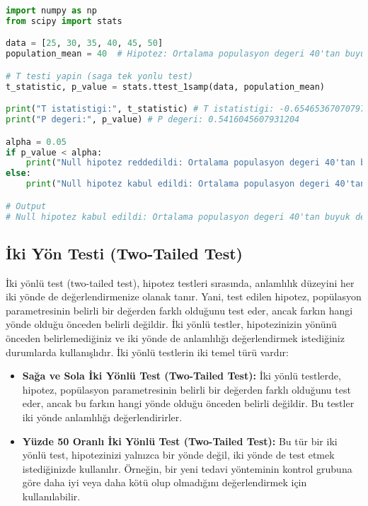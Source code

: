 \begin{lstlisting}[language=Python]
import numpy as np
from scipy import stats

data = [25, 30, 35, 40, 45, 50]
population_mean = 40  # Hipotez: Ortalama populasyon degeri 40'tan buyuktur.

# T testi yapin (saga tek yonlu test)
t_statistic, p_value = stats.ttest_1samp(data, population_mean)

print("T istatistigi:", t_statistic) # T istatistigi: -0.6546536707079772
print("P degeri:", p_value) # P degeri: 0.5416045607931204

alpha = 0.05
if p_value < alpha:
    print("Null hipotez reddedildi: Ortalama populasyon degeri 40'tan buyuktur.")
else:
    print("Null hipotez kabul edildi: Ortalama populasyon degeri 40'tan buyuk degildir.")

# Output
# Null hipotez kabul edildi: Ortalama populasyon degeri 40'tan buyuk degildir.
\end{lstlisting}

\newpage

\subsection{İki Yön Testi (Two-Tailed Test)}
İki yönlü test (two-tailed test), hipotez testleri sırasında, anlamlılık düzeyini her iki yönde de değerlendirmenize olanak tanır. Yani, test edilen hipotez, popülasyon parametresinin belirli bir değerden farklı olduğunu test eder, ancak farkın hangi yönde olduğu önceden belirli değildir. İki yönlü testler, hipotezinizin yönünü önceden belirlemediğiniz ve iki yönde de anlamlılığı değerlendirmek istediğiniz durumlarda kullanışlıdır. İki yönlü testlerin iki temel türü vardır:

\begin{itemize}
    \item \textbf{Sağa ve Sola İki Yönlü Test (Two-Tailed Test):} İki yönlü testlerde, hipotez, popülasyon parametresinin belirli bir değerden farklı olduğunu test eder, ancak bu farkın hangi yönde olduğu önceden belirli değildir. Bu testler iki yönde anlamlılığı değerlendirirler.
    \item \textbf{Yüzde 50 Oranlı İki Yönlü Test (Two-Tailed Test):} Bu tür bir iki yönlü test, hipotezinizi yalnızca bir yönde değil, iki yönde de test etmek istediğinizde kullanılır. Örneğin, bir yeni tedavi yönteminin kontrol grubuna göre daha iyi veya daha kötü olup olmadığını değerlendirmek için kullanılabilir.
\end{itemize}

